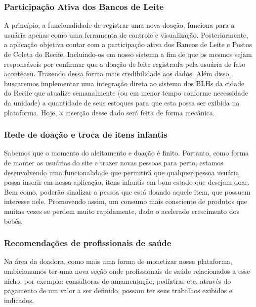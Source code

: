 \subsubsection{Participação Ativa dos Bancos de Leite}
A princípio, a funcionalidade de registrar uma nova doação, funciona para a usuária apenas como uma ferramenta de controle e visualização. Posteriormente, a aplicação objetiva contar com a participação ativa dos Bancos de Leite e Postos de Coleta do Recife. Incluindo-os em nosso sistema a fim de que os mesmos sejam responsáveis por confirmar que a doação de leite registrada pela usuária de fato aconteceu. Trazendo dessa forma mais credibilidade aos dados.
Além disso, buscaremos implementar uma integração direta ao sistema dos BLHs da cidade do Recife que atualize semanalmente (ou em menor tempo conforme necessidade da unidade) a quantidade de seus estoques para que esta possa ser exibida na plataforma. Hoje, a inserção desse dado será feita de forma mecânica.

\subsubsection{Rede de doação e troca de itens infantis}
Sabemos que o momento do aleitamento e doação é finito. Portanto, como forma de manter as usuárias do site e trazer novas pessoas para perto, estamos desenvolvendo uma funcionalidade que permitirá que qualquer pessoa usuária possa inserir em nossa aplicação, itens infantis em bom estado que desejam doar. Bem como, poderão sinalizar a pessoa que está doando aquele item, que possuem interesse nele. Promovendo assim, um consumo mais consciente de produtos que muitas vezes se perdem muito rapidamente, dado o acelerado crescimento dos bebês.

\subsubsection{Recomendações de profissionais de saúde}
Na área da doadora, como mais uma forma de monetizar nossa plataforma, ambicionamos ter uma nova seção onde profissionais de saúde relacionados a esse nicho, por exemplo: consultoras de amamentação, pediatras etc, através do pagamento de um valor a ser definido, possam ter seus trabalhos exibidos e indicados.